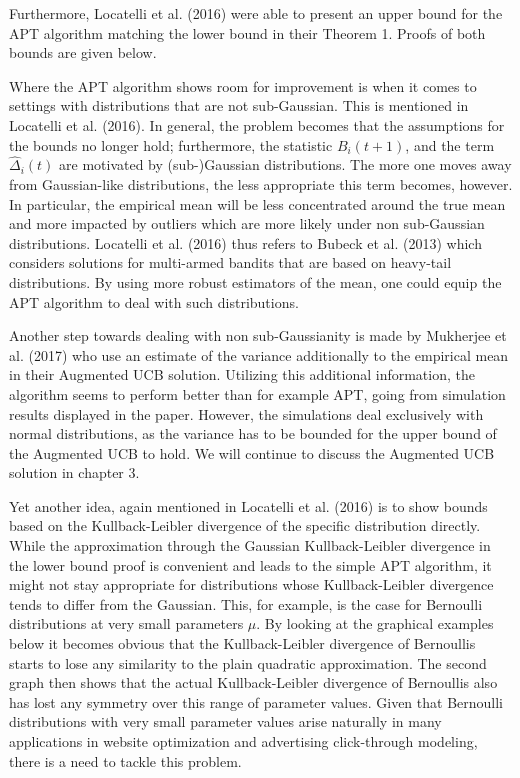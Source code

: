 \documentclass[12pt,]{article}
\begin{document}
Furthermore, Locatelli et al. (2016) were able to present an upper bound
for the APT algorithm matching the lower bound in their Theorem 1.
Proofs of both bounds are given below.

Where the APT algorithm shows room for improvement is when it comes to
settings with distributions that are not sub-Gaussian. This is mentioned
in Locatelli et al. (2016). In general, the problem becomes that the
assumptions for the bounds no longer hold; furthermore, the statistic
\(B_i(t+1)\), and the term \(\hat{\Delta}_i(t)\) are motivated by
(sub-)Gaussian distributions. The more one moves away from Gaussian-like
distributions, the less appropriate this term becomes, however. In
particular, the empirical mean will be less concentrated around the true
mean and more impacted by outliers which are more likely under non
sub-Gaussian distributions. Locatelli et al. (2016) thus refers to
Bubeck et al. (2013) which considers solutions for multi-armed bandits
that are based on heavy-tail distributions. By using more robust
estimators of the mean, one could equip the APT algorithm to deal with
such distributions.

Another step towards dealing with non sub-Gaussianity is made by
Mukherjee et al. (2017) who use an estimate of the variance additionally
to the empirical mean in their Augmented UCB solution. Utilizing this
additional information, the algorithm seems to perform better than for
example APT, going from simulation results displayed in the paper.
However, the simulations deal exclusively with normal distributions, as
the variance has to be bounded for the upper bound of the Augmented UCB
to hold. We will continue to discuss the Augmented UCB solution in
chapter 3.

Yet another idea, again mentioned in Locatelli et al. (2016) is to show
bounds based on the Kullback-Leibler divergence of the specific
distribution directly. While the approximation through the Gaussian
Kullback-Leibler divergence in the lower bound proof is convenient and
leads to the simple APT algorithm, it might not stay appropriate for
distributions whose Kullback-Leibler divergence tends to differ from the
Gaussian. This, for example, is the case for Bernoulli distributions at
very small parameters \(\mu\). By looking at the graphical examples
below it becomes obvious that the Kullback-Leibler divergence of
Bernoullis starts to lose any similarity to the plain quadratic
approximation. The second graph then shows that the actual
Kullback-Leibler divergence of Bernoullis also has lost any symmetry
over this range of parameter values. Given that Bernoulli distributions
with very small parameter values arise naturally in many applications in
website optimization and advertising click-through modeling, there is a
need to tackle this problem.
\end{document}
